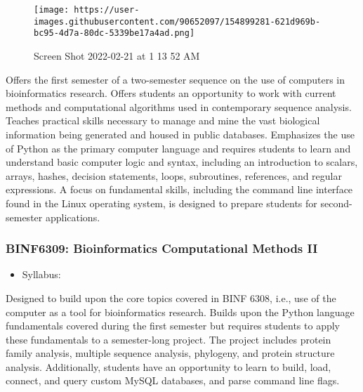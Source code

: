 \documentclass[
  letterpaper,
  DIV=11,
  numbers=noendperiod]{scrreprt}
\providecommand{\tightlist}{%
  \setlength{\itemsep}{0pt}\setlength{\parskip}{0pt}}\usepackage{longtable,booktabs,array}
\begin{document}
\begin{figure}

{\centering \texttt{[image: https://user-images.githubusercontent.com/90652097/154899281-621d969b-bc95-4d7a-80dc-5339be17a4ad.png]}

}

\caption{Screen Shot 2022-02-21 at 1 13 52 AM}

\end{figure}

Offers the first semester of a two-semester sequence on the use of
computers in bioinformatics research. Offers students an opportunity to
work with current methods and computational algorithms used in
contemporary sequence analysis. Teaches practical skills necessary to
manage and mine the vast biological information being generated and
housed in public databases. Emphasizes the use of Python as the primary
computer language and requires students to learn and understand basic
computer logic and syntax, including an introduction to scalars, arrays,
hashes, decision statements, loops, subroutines, references, and regular
expressions. A focus on fundamental skills, including the command line
interface found in the Linux operating system, is designed to prepare
students for second-semester applications.

\hypertarget{binf6309-bioinformatics-computational-methods-ii}{%
\subsubsection*{\texorpdfstring{\textbf{BINF6309: Bioinformatics
Computational Methods
II}}{BINF6309: Bioinformatics Computational Methods II}}\label{binf6309-bioinformatics-computational-methods-ii}}

\begin{itemize}
\tightlist
\item
  Syllabus:
\end{itemize}

Designed to build upon the core topics covered in BINF 6308, i.e., use
of the computer as a tool for bioinformatics research. Builds upon the
Python language fundamentals covered during the first semester but
requires students to apply these fundamentals to a semester-long
project. The project includes protein family analysis, multiple sequence
analysis, phylogeny, and protein structure analysis. Additionally,
students have an opportunity to learn to build, load, connect, and query
custom MySQL databases, and parse command line flags.
\end{document}
